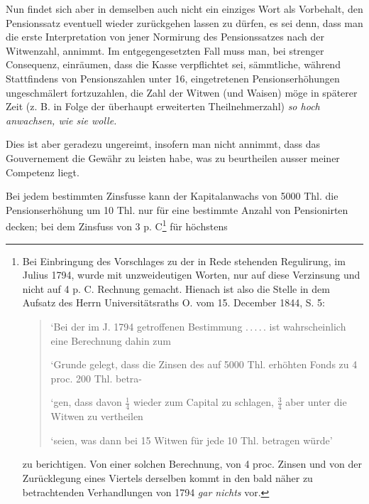 Nun findet sich aber in demselben auch nicht ein einziges Wort als Vorbehalt, den Pensionssatz eventuell wieder zurückgehen lassen zu dürfen, es sei denn, dass man die erste Interpretation von jener Normirung des Pensionssatzes nach der Witwenzahl, annimmt. Im entgegengesetzten Fall muss man, bei strenger Consequenz, einräumen, dass die Kasse verpflichtet sei, sämmtliche, während Stattfindens von Pensionszahlen unter 16, eingetretenen Pensionserhöhungen ungeschmälert fortzuzahlen, die Zahl der Witwen (und Waisen) möge in späterer Zeit (z. B. in Folge der überhaupt erweiterten Theilnehmerzahl) \textit{so hoch anwachsen, wie sie wolle.}

Dies ist aber geradezu ungereimt, insofern man nicht annimmt, dass das Gouvernement die Gewähr zu leisten habe, was zu beurtheilen ausser meiner Competenz liegt.

Bei jedem bestimmten Zinsfusse kann der Kapitalanwachs von 5000 Thl. die Pensionserhöhung um 10 Thl. nur für eine bestimmte Anzahl von Pensionirten decken; bei dem Zinsfuss von 3 p. C\footnote{Bei Einbringung des Vorschlages zu der in Rede stehenden Regulirung, im Julius 1794, wurde mit unzweideutigen Worten, nur auf diese Verzinsung und nicht auf 4 p. C. Rechnung gemacht. Hienach ist also die Stelle in dem Aufsatz des Herrn Universitätsraths O. vom 15. December 1844, S. 5:
\begin{quote}\raggedright
‘Bei der im J. 1794 getroffenen Bestimmung .\,.\,.\,.\,. ist wahrscheinlich eine Berechnung dahin zum\par
‘Grunde gelegt, dass die Zinsen des auf 5000 Thl. erhöhten Fonds zu 4 proc. 200 Thl. betra-\par
‘gen, dass davon \(\tfrac14\) wieder zum Capital zu schlagen, \(\tfrac34\) aber unter die Witwen zu vertheilen\par
‘seien, was dann bei 15 Witwen für jede 10 Thl. betragen würde’
\end{quote}
zu berichtigen. Von einer solchen Berechnung, von 4 proc. Zinsen und von der Zurücklegung eines Viertels derselben kommt in den bald näher zu betrachtenden Verhandlungen von 1794 \textit{gar nichts} vor.} für höchstens
